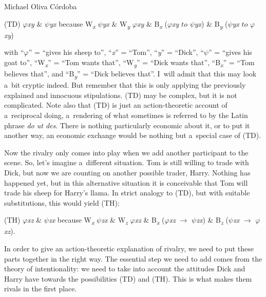 \begin{artengenv}{Michael Oliva Córdoba}
\medskip

\noindent (TD) \textit{$\varphi $xy} \& \textit{$\psi $yx} because W\textit{\textsubscript{x}} \textit{$\psi $yx} \& W\textit{\textsubscript{y}} \textit{$\varphi $xy} \& B\textit{\textsubscript{x}} (\textit{$\varphi $xy} $to$ \textit{$\psi $yx}) \& B\textit{\textsubscript{y}} (\textit{$\psi $yx} $to$ \textit{$\varphi $xy})



\medskip

\noindent with ``\textit{$\varphi $}'' = ``gives his sheep to'', ``\textit{x}'' = ``Tom'', ``\textit{y}'' = ``Dick'', ``\textit{$\psi $}'' = ``gives his goat to'', ``W\textit{\textsubscript{x}}'' = ``Tom wants that'', ``W\textit{\textsubscript{y}}'' = ``Dick wants that'', ``B\textit{\textsubscript{x}}'' = ``Tom believes that'', and ``B\textit{\textsubscript{y}}'' = ``Dick believes that''. I~will admit that this may look a~bit cryptic indeed. But remember that this is only applying the previously explained and innocuous stipulations. (TD) may be complex, but it is not complicated. Note also that (TD) is just an action-theoretic account of a~reciprocal doing, a~rendering of what sometimes is referred to by the Latin phrase \textit{do ut des}. There is nothing particularly economic about it, or to put it another way, an economic exchange would be nothing but a~special case of (TD).



Now the rivalry only comes into play when we add another participant to the scene. So, let's imagine a~different situation. Tom is still willing to trade with Dick, but now we are counting on another possible trader, Harry. Nothing has happened yet, but in this alternative situation it is conceivable that Tom will trade his sheep for Harry's llama. In strict analogy to (TD), but with suitable substitutions, this would yield (TH):



\medskip

\noindent (TH) \textit{$\varphi $xz} \& \textit{$\psi $zx} because W\textit{\textsubscript{x}} \textit{$\psi $zx} \& W\textit{\textsubscript{z}} \textit{$\varphi $xz} \& B\textit{\textsubscript{x}} (\textit{$\varphi $xz} $\to$ \textit{$\psi $zx}) \& B\textit{\textsubscript{z}} (\textit{$\psi $zx} $\to$ \textit{$\varphi $xz}).



\medskip

In order to give an action-theoretic explanation of rivalry, we need to put these parts together in the right way. The essential step we need to add comes from the theory of intentionality: we need to take into account the attitudes Dick and Harry have towards the possibilities (TD) and (TH). This is what makes them rivals in the first place.




\end{artengenv}
